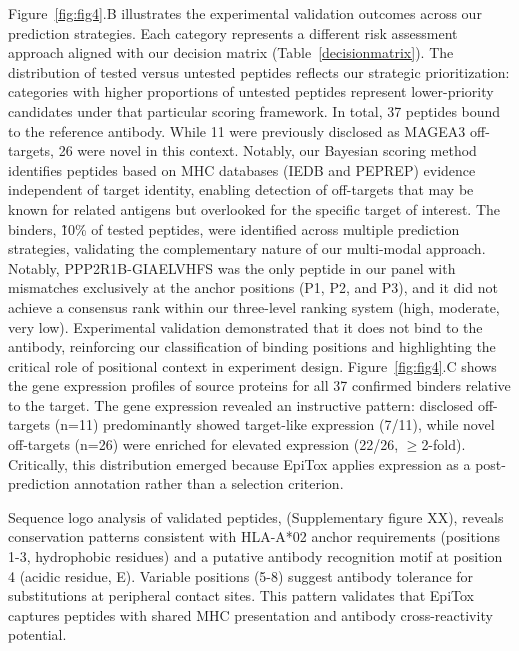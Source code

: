 \documentclass[unnumsec,webpdf,contemporary,large]{oup-authoring-template}%
\theoremstyle{thmstyleone}%
\theoremstyle{thmstyletwo}%
\theoremstyle{thmstylethree}%
\begin{document}
        Figure~\ref{fig:fig4}.B illustrates the experimental validation outcomes across our prediction strategies. Each category represents a different risk assessment approach aligned with our decision matrix (Table~\ref{decisionmatrix}). The distribution of tested versus untested peptides reflects our strategic prioritization: categories with higher proportions of untested peptides represent lower-priority candidates under that particular scoring framework. In total, 37 peptides bound to the reference antibody. While 11 were previously disclosed as MAGEA3 off-targets, 26 were novel in this context. Notably, our Bayesian scoring method identifies peptides based on MHC databases (IEDB and PEPREP) evidence independent of target identity, enabling detection of off-targets that may be known for related antigens but overlooked for the specific target of interest. 
        The binders, \~10\% of tested peptides, were identified across multiple prediction strategies, validating the complementary nature of our multi-modal approach. 
        Notably, PPP2R1B-GIAELVHFS was the only peptide in our panel with mismatches exclusively at the anchor positions (P1, P2, and P3), and it did not achieve a consensus rank within our three-level ranking system (high, moderate, very low). Experimental validation demonstrated that it does not bind to the antibody, reinforcing our classification of binding positions and highlighting the critical role of positional context in experiment design.
        Figure~\ref{fig:fig4}.C shows the gene expression profiles of source proteins for all 37 confirmed binders relative to the target. The gene expression revealed an instructive pattern: disclosed off-targets (n=11) predominantly showed target-like expression (7/11), while novel off-targets (n=26) were enriched for elevated expression (22/26, $\geq$2-fold). Critically, this distribution emerged because EpiTox applies expression as a post-prediction annotation rather than a selection criterion.

        Sequence logo analysis of validated peptides, (Supplementary figure XX), reveals conservation patterns consistent with HLA-A*02 anchor requirements (positions 1-3, hydrophobic residues) and a putative antibody recognition motif at position 4 (acidic residue, E). Variable positions (5-8) suggest antibody tolerance for substitutions at peripheral contact sites. This pattern validates that EpiTox captures peptides with shared MHC presentation and antibody cross-reactivity potential.
\end{document}
